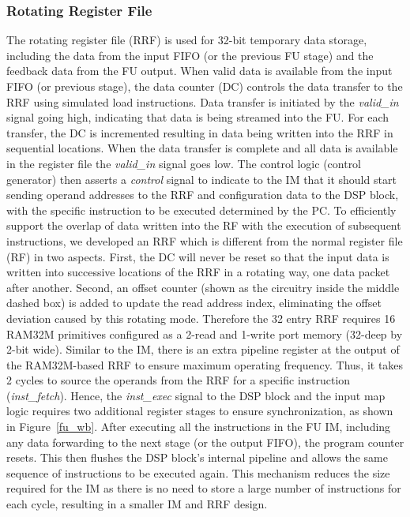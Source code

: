 \subsubsection{Rotating Register File}
The rotating register file (RRF) is used for 32-bit temporary data storage, including the data from the input FIFO (or the previous FU stage) and the feedback data from the FU output. 
When valid data is available from the input FIFO (or previous stage), the data counter (DC) controls the data transfer to the RRF using simulated load instructions. 
Data transfer is initiated by the \textit{valid\_in} signal going high, indicating that data is being streamed into the FU. 
For each transfer, the DC is incremented resulting in data being written into the RRF in sequential locations. 
When the data transfer is complete and all data is available in the register file the \textit{valid\_in} signal goes low. 
The control logic (control generator) then asserts a \textit{control} signal to indicate to the IM that it should start sending operand addresses to the RRF and configuration data to the DSP block, with the specific instruction to be executed determined by the PC. 
To efficiently support the overlap of data written into the RF with the execution of subsequent instructions, we developed an RRF which is different from the normal register file (RF) in two aspects. 
First, the DC will never be reset so that the input data is written into successive locations of the RRF in a rotating way, one data packet after another. 
Second, an offset counter (shown as the circuitry inside the middle dashed box) is added to update the read address index, eliminating the offset deviation caused by this rotating mode. 
Therefore the 32 entry RRF requires 16 RAM32M primitives configured as a 2-read and 1-write port memory (32-deep by 2-bit wide). 
Similar to the IM, there is an extra pipeline register at the output of the RAM32M-based RRF to ensure maximum operating frequency. 
Thus, it takes 2 cycles to source the operands from the RRF for a specific instruction (\textit{inst\_fetch}). 
Hence, the \textit{inst\_exec} signal to the DSP block and the input map logic requires two additional register stages to ensure synchronization, as shown in Figure~\ref{fu_wb}. 
After executing all the instructions in the FU IM, including any data forwarding to the next stage (or the output FIFO), the program counter resets. This then flushes the DSP block's internal pipeline and allows the same sequence of instructions to be executed again. This mechanism reduces the size required for the IM as there is no need to store a large number of instructions for each cycle, resulting in a smaller IM and RRF design. 


